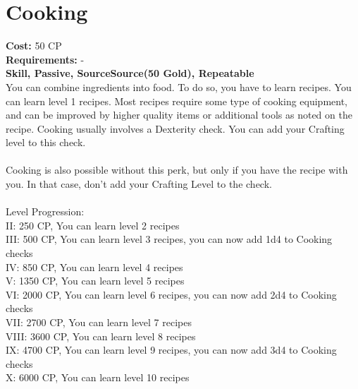 \section{Cooking}\label{perk:cooking}
\textbf{Cost:} 50 CP\\
\textbf{Requirements:} -\\
\textbf{Skill, Passive, SourceSource(50 Gold), Repeatable}\\
You can combine ingredients into food.
To do so, you have to learn recipes.
You can learn level 1 recipes.
Most recipes require some type of cooking equipment, and can be improved by higher quality items or additional tools as noted on the recipe.
Cooking usually involves a Dexterity check.
You can add your Crafting level to this check. \\
\\
Cooking is also possible without this perk, but only if you have the recipe with you.
In that case, don't add your Crafting Level to the check.\\
\\
Level Progression:\\
II: 250 CP, You can learn level 2 recipes\\
III: 500 CP, You can learn level 3 recipes, you can now add 1d4 to Cooking checks\\
IV: 850 CP, You can learn level 4 recipes\\
V: 1350 CP, You can learn level 5 recipes\\
VI: 2000 CP, You can learn level 6 recipes, you can now add 2d4 to Cooking checks\\
VII: 2700 CP, You can learn level 7 recipes\\
VIII: 3600 CP, You can learn level 8 recipes\\
IX: 4700 CP, You can learn level 9 recipes, you can now add 3d4 to Cooking checks\\
X: 6000 CP, You can learn level 10 recipes\\
